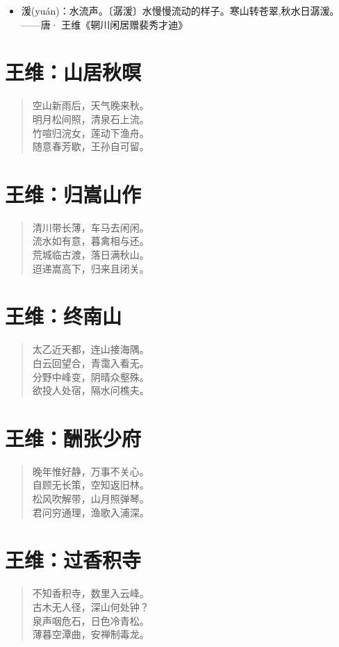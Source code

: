 \documentclass[12pt,oneside]{book}
\newenvironment{shici}{
\begin{verse}
\centering\large\hspace{12pt}}
{\end{verse}}
\begin{document}
\begin{itemize}
\item 湲(yuán)：水流声。〔潺湲〕水慢慢流动的样子。寒山转苍翠,秋水日潺湲。——唐· 王维《辋川闲居赠裴秀才迪》
\end{itemize}

\chapter{王维：山居秋暝}
\begin{shici}
空山新雨后，天气晚来秋。\\
明月松间照，清泉石上流。\\
竹喧归浣女，莲动下渔舟。\\
随意春芳歇，王孙自可留。
\end{shici}

\chapter{王维：归嵩山作}
\begin{shici}
清川带长薄，车马去闲闲。\\
流水如有意，暮禽相与还。\\
荒城临古渡，落日满秋山。\\
迢递嵩高下，归来且闭关。
\end{shici}

\chapter{王维：终南山}
\begin{shici}
太乙近天都，连山接海隅。\\
白云回望合，青霭入看无。\\
分野中峰变，阴晴众壑殊。\\
欲投人处宿，隔水问樵夫。
\end{shici}

\chapter{王维：酬张少府}
\begin{shici}
晚年惟好静，万事不关心。\\
自顾无长策，空知返旧林。\\
松风吹解带，山月照弹琴。\\
君问穷通理，渔歌入浦深。
\end{shici}

\chapter{王维：过香积寺}
\begin{shici}
不知香积寺，数里入云峰。\\
古木无人径，深山何处钟？\\
泉声咽危石，日色冷青松。\\
薄暮空潭曲，安禅制毒龙。
\end{shici}
\end{document}
